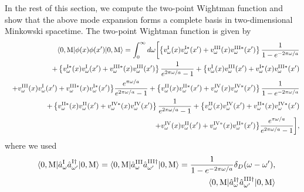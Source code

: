 \documentclass[aps,prd,preprintnumbers,nofootinbib,showpacs]{revtex4}%
\begin{document}
\begin{widetext}
In the rest of this section,
 we compute the two-point Wightman function and show that the above mode expansion
forms a complete basis in two-dimensional Minkowski spacetime.
The two-point Wightman function is given by
\begin{eqnarray}
&&\langle0,{\rm M}|\phi(x)\phi(x')|0,{\rm M}\rangle=\int_0^\infty d\omega \biggl[\left\{
v_{\omega}^{\rm I}(x)v_{\omega}^{\rm I*}(x')
+v_{\omega}^{\rm III}(x)v_{\omega}^{\rm III*}(x')
\right\}{1\over 1-e^{-2\pi\omega/a}}
\nonumber\\
&&+\left\{
v_{\omega}^{\rm I*}(x)v_{\omega}^{\rm I}(x')
+v_{\omega}^{\rm III*}(x)v_{\omega}^{\rm III}(x')
\right\}{1\over e^{2\pi\omega/a}-1}
+\bigl\{
v_{\omega}^{\rm I}(x)v_{\omega}^{\rm III}(x')
+v_{\omega}^{\rm I*}(x)v_{\omega}^{\rm III*}(x')
\nonumber\\
&&+
v_{\omega}^{\rm III}(x)v_{\omega}^{\rm I}(x')
+v_{\omega}^{\rm III*}(x)v_{\omega}^{\rm I*}(x')
\bigr\}{e^{\pi\omega/a}\over e^{2\pi\omega/a}-1}
+\left\{v_{\omega}^{\rm II}(x)v_{\omega}^{\rm II*}(x')
+v_{\omega}^{\rm IV}(x)v_{\omega}^{\rm IV*}(x')
\right\}{1\over 1-e^{-2\pi\omega/a}}
\nonumber\\
&&+\left\{
v_{\omega}^{\rm II*}(x)v_{\omega}^{\rm II}(x')
+v_{\omega}^{\rm IV*}(x)v_{\omega}^{\rm IV}(x')
\right\}{1\over e^{2\pi\omega/a}-1}
+\bigl\{
v_{\omega}^{\rm II}(x)v_{\omega}^{\rm IV}(x')
+v_{\omega}^{\rm II*}(x)v_{\omega}^{\rm IV*}(x')
\nonumber\\
&&+
v_{\omega}^{\rm IV}(x)v_{\omega}^{\rm II}(x')
+v_{\omega}^{\rm IV*}(x)v_{\omega}^{\rm II*}(x')
\bigr\}{e^{\pi\omega/a}\over e^{2\pi\omega/a}-1}\biggr],
\end{eqnarray}
where we used
\begin{eqnarray}
&& \langle0,{\rm M}|\hat a_{\omega}^{\rm I}\hat a_{\omega'}^{\rm I \dagger}|0,{\rm M}\rangle
=\langle0,{\rm M}|\hat a_{\omega}^{\rm III}\hat a_{\omega'}^{\rm III \dagger}|0,{\rm M}\rangle
={1\over 1- e^{-2\pi\omega/a} }\delta_D(\omega-\omega'),
\nonumber
\\
&&\langle0,{\rm M}|\hat a_{\omega}^{\rm I \dagger}\hat a_{\omega'}^{\rm III \dagger}|0,{\rm M}\rangle

\end{eqnarray}
\end{widetext}
\end{document}
